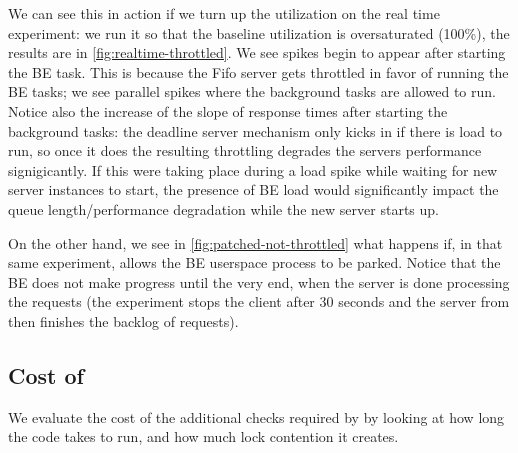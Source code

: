 We can see this in action if we turn up the utilization on the real time
experiment: we run it so that the baseline utilization is oversaturated (100\%),
the results are in \autoref{fig:realtime-throttled}. We see spikes begin to
appear after starting the BE task. This is because the Fifo server gets
throttled in favor of running the BE tasks; we see parallel spikes where the
background tasks are allowed to run. Notice also the increase of the slope of
response times after starting the background tasks: the deadline server
mechanism only kicks in if there is load to run, so once it does the resulting
throttling degrades the servers performance signigicantly. If this were taking
place during a load spike while waiting for new server instances to start, the
presence of BE load would significantly impact the queue length/performance
degradation while the new server starts up.

On the other hand, we see in \autoref{fig:patched-not-throttled} what happens
if, in that same experiment, \schedbe{} allows the BE userspace process to be
parked. Notice that the BE does not make progress until the very end, when the
server is done processing the requests (the experiment stops the client after 30
seconds and the server from then finishes the backlog of requests).



\subsection{Cost of \schedbe{}}

We evaluate the cost of the additional checks required by \schedbe{} by looking
at how long the code takes to run, and how much lock contention it creates.